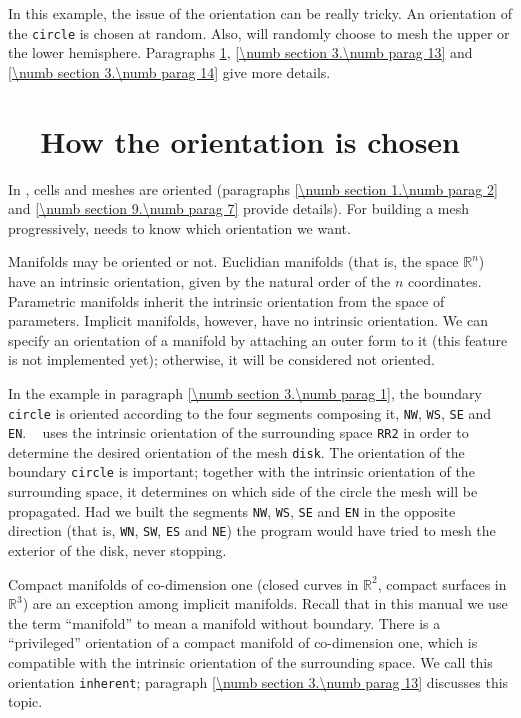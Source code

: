 In this example, the issue of the orientation can be really tricky.
An orientation of the {\small\tt circle} is chosen at random.
Also, {\maniFEM} will randomly choose to mesh the upper or the lower hemisphere.
Paragraphs \ref{\numb section 3.\numb parag 10}, \ref{\numb section 3.\numb parag 13} and
\ref{\numb section 3.\numb parag 14} give more details.


\section{~~How the orientation is chosen}\label{\numb section 3.\numb parag 10}

In \maniFEM, cells and meshes are oriented (paragraphs \ref{\numb section 1.\numb parag 2}
and \ref{\numb section 9.\numb parag 7} provide details).
For building a mesh progressively, {\maniFEM} needs to know which orientation we want.

Manifolds may be oriented or not.
Euclidian manifolds (that is, the space $ \mathbb{R}^n $) have an intrinsic orientation,
given by the natural order of the $n$ coordinates.
Parametric manifolds inherit the intrinsic orientation from the space of parameters.
Implicit manifolds, however, have no intrinsic orientation.
We can specify an orientation of a manifold by attaching an outer form to it
(this feature is not implemented yet); otherwise, it will be considered not oriented.

In the example in paragraph \ref{\numb section 3.\numb parag 1}, the boundary {\small\tt circle}
is oriented according to the four segments composing it, {\small\tt NW}, {\small\tt WS},
{\small\tt SE} and {\small\tt EN}.
\ {\ManiFEM} uses the intrinsic orientation of the surrounding space {\small\tt RR2} in order
to determine the desired orientation of the mesh {\small\tt disk}.
The orientation of the boundary {\small\tt circle} is important;
together with the intrinsic orientation of the surrounding space,
it determines on which side of the circle the mesh will be propagated.
Had we built the segments {\small\tt NW}, {\small\tt WS}, {\small\tt SE} and {\small\tt EN} in the
opposite direction (that is, {\small\tt WN}, {\small\tt SW}, {\small\tt ES} and {\small\tt NE})
the program would have tried to mesh the exterior of the disk, never stopping.

Compact manifolds of co-dimension one (closed curves in $ \mathbb{R}^2 $,
compact surfaces in $ \mathbb{R}^3 $) are an exception among implicit manifolds.
Recall that in this manual we use the term ``manifold'' to mean a manifold without boundary.
There is a ``privileged'' orientation of a compact manifold of co-dimension one,
which is compatible with the intrinsic orientation of the surrounding space.
We call this orientation {\small\tt inherent}; paragraph \ref{\numb section 3.\numb parag 13}
discusses this topic.

